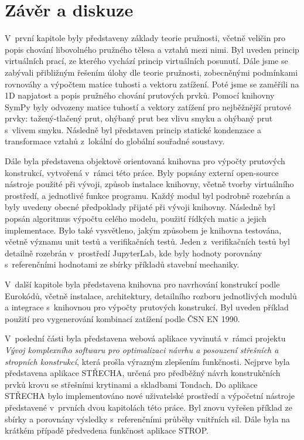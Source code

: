\chapter*{Závěr a diskuze}
\pagestyle{plain}
V~první kapitole byly představeny základy teorie pružnosti, včetně veličin pro popis chování libovolného pružného tělesa a vztahů mezi nimi. Byl uveden princip virtuálních prací, ze kterého vychází princip virtuálních posunutí. Dále jsme se zabývali přibližným řešením úlohy dle teorie pružnosti, zobecněnými podmínkami rovnováhy a výpočtem matice tuhosti a vektoru zatížení. Poté jsme se zaměřili na 1D napjatost a popis pružného chování prutových prvků. Pomocí knihovny SymPy byly odvozeny matice tuhostí a vektory zatížení pro nejběžnější prutové prvky: tažený-tlačený prut, ohýbaný prut bez vlivu smyku a ohýbaný prut s~vlivem smyku. Následně byl představen princip statické kondenzace a transformace vztahů z~lokální do globální souřadné soustavy.

Dále byla představena objektově orientovaná knihovna pro výpočty prutových konstrukcí, vytvořená v~rámci této práce. Byly popsány externí open-source nástroje použité při vývoji, způsob instalace knihovny, včetně tvorby virtuálního prostředí, a jednotlivé funkce programu. Každý modul byl podrobně rozebrán a byly uvedeny obecné předpoklady přijaté při vývoji knihovny. Následně byl popsán algoritmus výpočtu celého modelu, použití řídkých matic a jejich implementace. Bylo také vysvětleno, jakým způsobem je knihovna testována, včetně významu unit testů a verifikačních testů. Jeden z~verifikačních testů byl detailně rozebrán v~prostředí JupyterLab, kde byly hodnoty porovnány s~referenčními hodnotami ze sbírky příkladů stavební mechaniky.

V~další kapitole byla představena knihovna pro navrhování konstrukcí podle Eurokódů, včetně instalace, architektury, detailního rozboru jednotlivých modulů a integrace s~knihovnou pro výpočty prutových konstrukcí. Byl uveden příklad použití pro vygenerování kombinací zatížení podle ČSN EN 1990.

V~poslední části byla představena webová aplikace vyvinutá v~rámci projektu \textit{Vývoj komplexního softwaru pro optimalizaci návrhu a posouzení střešních a stropních konstrukcí}, která prošla výrazným zlepšením funkčnosti. Nejprve byla představena aplikace STŘECHA, určená pro předběžný návrh konstrukčních prvků krovu se střešními krytinami a skladbami Tondach. Do aplikace STŘECHA bylo implementováno nové uživatelské prostředí a výpočetní nástroje představené v~prvních dvou kapitolách této práce. Byl znovu vyřešen příklad ze sbírky \cite{sbirka_prikladu} a porovnány výsledky s~referenčními průběhy vnitřních sil. Dále byla na krátkém případě předvedena funkčnost aplikace STROP.

